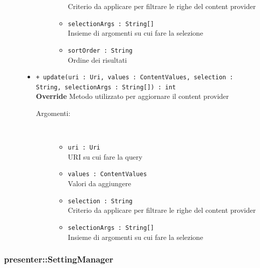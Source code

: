 \documentclass[../DefinizioneDiProdotto.tex]{subfiles}
\begin{document}
\begin{description}
\begin{itemize}
\begin{description}
\begin{itemize}
Criterio da applicare per filtrare le righe del content provider\item \texttt{selectionArgs : String[]}\\
Insieme di argomenti su cui fare la selezione\item \texttt{sortOrder : String}\\
Ordine dei risultati\end{itemize}
\end{description}
\item \texttt{+ update(uri : Uri, values : ContentValues, selection : String, selectionArgs : String[]) : int}\\
\textbf{Override} Metodo utilizzato per aggiornare il content provider
 \begin{description}
\item[Argomenti:] \
\begin{itemize}
\item \texttt{uri : Uri}\\
URI su cui fare la query\item \texttt{values : ContentValues}\\
Valori da aggiungere\item \texttt{selection : String}\\
Criterio da applicare per filtrare le righe del content provider\item \texttt{selectionArgs : String[]}\\
Insieme di argomenti su cui fare la selezione\end{itemize}
\end{description}
\end{itemize}
\end{description}

\subsubsection{presenter::SettingManager}
\end{document}
